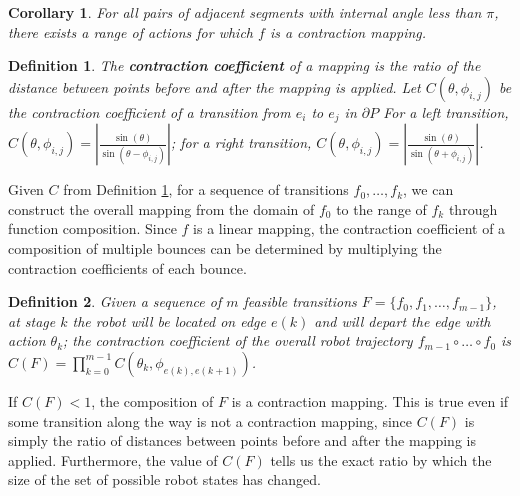 \documentclass[sageh,times,Review]{sagej}
\newtheorem{definition}{Definition}
\newtheorem{corollary}{Corollary}
\begin{document}

\begin{corollary} \label{coro:existcontract}
For all pairs of adjacent 
segments with internal angle less than $\pi$,
there exists a range of actions for which $f$ is a contraction mapping.
\end{corollary}

\begin{definition} \label{def:cc}
The \textbf{contraction coefficient} of a mapping is the ratio of the distance between points before and after
the mapping is applied.
Let $C(\theta, \phi_{i, j})$ be the contraction coefficient of a transition from $e_i$ to $e_j$ in $\partial P$
For a left transition, $C(\theta, \phi_{i, j}) = | \frac{\sin(\theta)}{\sin(\theta - \phi_{i, j})} |$; 
for a right transition,  $C(\theta, \phi_{i, j}) = | \frac{\sin(\theta)}{\sin(\theta + \phi_{i, j})} |$.
\end{definition}

Given $C$ from Definition \ref{def:cc}, for a sequence of transitions $f_0, \ldots, f_k$, 
we can construct the overall mapping from the domain of $f_0$ to the range of $f_k$ through function
composition. Since $f$ is a linear mapping, the contraction coefficient of a composition 
of multiple bounces can be determined by multiplying the contraction
coefficients of each bounce.

\begin{definition} \label{def:c}
Given a sequence of $m$ feasible transitions $F = \{f_0, f_1, \ldots, f_{m-1}\}$, at stage $k$ the robot 
will be located on edge $e(k)$ and will depart the edge with
action $\theta_k$; the contraction coefficient of the overall robot
trajectory $f_{m-1} \circ \ldots \circ f_0$ is $C(F) = \prod_{k=0}^{m-1} C(\theta_{k}, \phi_{e(k), e(k+1)})$.
\end{definition}

If $C(F) < 1$, the composition of $F$ is a contraction mapping. This is true even if some transition along
the way is not a
contraction mapping, since $C(F)$ is simply the ratio of distances
between points before and after the mapping is applied. Furthermore, the value
of $C(F)$ tells us the exact ratio by which the
size of the set of possible robot states has changed.
\end{document}
